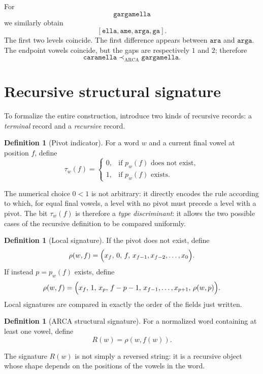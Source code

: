 \documentclass[11pt,a4paper]{article}
\theoremstyle{definition}
\newtheorem{definition}[theorem]{Definition}
\theoremstyle{remark}
\newcommand{\ARCA}{\mathrm{ARCA}}
\newcommand{\precA}{\prec_{\ARCA}}
\newcommand{\Sig}{R}
\newcommand{\localSig}{\rho}
\newcommand{\Pivot}{p_w}
\newcommand{\Tag}{\tau_w}
\begin{document}
For
\[
  \texttt{gargamella}
\]
we similarly obtain
\[
  [\texttt{ella},\texttt{ame},\texttt{arga},\texttt{ga}].
\]
The first two levels coincide. The first difference appears between $\texttt{ara}$ and $\texttt{arga}$. The endpoint vowels coincide, but the gaps are respectively $1$ and $2$; therefore
\[
  \texttt{caramella}\precA\texttt{gargamella}.
\]

\section{Recursive structural signature}

To formalize the entire construction, introduce two kinds of recursive records: a \emph{terminal} record and a \emph{recursive} record.

\begin{definition}[Pivot indicator]
For a word $w$ and a current final vowel at position $f$, define
\[
  \Tag(f)=
  \begin{cases}
    0, & \text{if }\Pivot(f)\text{ does not exist},\\
    1, & \text{if }\Pivot(f)\text{ exists}.
  \end{cases}
\]
\end{definition}

The numerical choice $0<1$ is not arbitrary: it directly encodes the rule according to which, for equal final vowels, a level with no pivot must precede a level with a pivot. The bit $\Tag(f)$ is therefore a \emph{type discriminant}: it allows the two possible cases of the recursive definition to be compared uniformly.

\begin{definition}[Local signature]
If the pivot does not exist, define
\[
  \localSig(w,f)=
  \Bigl(
    x_f,\,0,\,f,\,x_{f-1},x_{f-2},\dots,x_0
  \Bigr).
\]
If instead $p=\Pivot(f)$ exists, define
\[
  \localSig(w,f)=
  \Bigl(
    x_f,\,1,\,x_p,\,f-p-1,\,
    x_{f-1},\dots,x_{p+1},\,
    \localSig(w,p)
  \Bigr).
\]
Local signatures are compared in exactly the order of the fields just written.
\end{definition}

\begin{definition}[ARCA structural signature]
For a normalized word containing at least one vowel, define
\[
  \Sig(w)=\localSig(w,f(w)).
\]
\end{definition}

The signature $\Sig(w)$ is not simply a reversed string: it is a recursive object whose shape depends on the positions of the vowels in the word.
\end{document}
